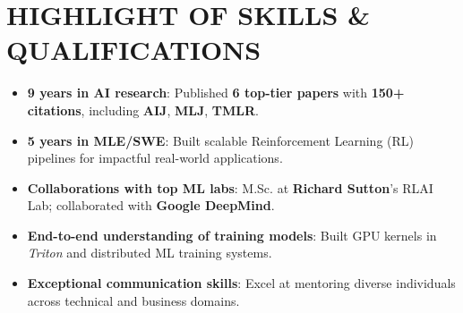\section{HIGHLIGHT OF SKILLS \& QUALIFICATIONS}
\begin{itemize}
    \item \textbf{9 years in AI research}: Published \textbf{6 top-tier papers} with \textbf{150+ citations}, including \textbf{AIJ}, \textbf{MLJ}, \textbf{TMLR}.
    \item \textbf{5 years in MLE/SWE}: Built scalable Reinforcement Learning (RL) pipelines for impactful real-world applications.
    \item \textbf{Collaborations with top ML labs}: M.Sc. at \textbf{Richard Sutton}'s RLAI Lab; collaborated with \textbf{Google DeepMind}.
    \item \textbf{End-to-end understanding of training models}: Built GPU kernels in \textit{Triton} and distributed ML training systems.
    \item \textbf{Exceptional communication skills}: Excel at mentoring diverse individuals across technical and business domains.
\end{itemize}
